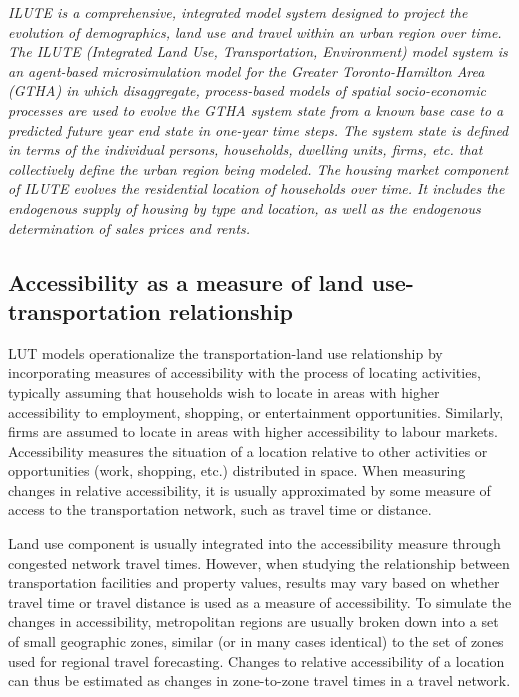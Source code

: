 \textit{ILUTE is a comprehensive, integrated model system designed to project the evolution of demographics, land use and travel within an urban region over time.
The ILUTE (Integrated Land Use, Transportation, Environment) model system is an agent-based microsimulation model for the Greater Toronto-Hamilton Area (GTHA) in which disaggregate, process-based models of spatial socio-economic processes are used to evolve the GTHA system state from a known base case to a predicted future year end state in one-year time steps.
The system state is defined in terms of the individual persons, households, dwelling units, firms, etc.
that collectively define the urban region being modeled.
The housing market component of ILUTE evolves the residential location of households over time.
It includes the endogenous supply of housing by type and location, as well as the endogenous determination of sales prices and rents.}\cite{Miller2010}

\subsection{Accessibility as a measure of land use-transportation relationship} \label{subsec:accessibility}

LUT models operationalize the transportation-land use relationship by incorporating measures of accessibility with the process of locating activities, typically assuming that households wish to locate in areas with higher accessibility to employment, shopping, or entertainment opportunities.
Similarly, firms are assumed to locate in areas with higher accessibility to labour markets.
Accessibility measures the situation of a location relative to other activities or opportunities (work, shopping, etc.) distributed in space\cite{Iacono2008}.
When measuring changes in relative accessibility, it is usually approximated by some measure of access to the transportation network, such as travel time or distance.

Land use component is usually integrated into the accessibility measure through congested network travel times.
However, when studying the relationship between transportation facilities and property values, results may vary based on whether travel time or travel distance is used as a measure of accessibility\cite{Sherry1999}.
To simulate the changes in accessibility, metropolitan regions are usually broken down into a set of small geographic zones, similar (or in many cases identical) to the set of zones used for regional travel forecasting.
Changes to relative accessibility of a location can thus be estimated as changes in zone-to-zone travel times in a travel network\cite{Iacono2008}.

